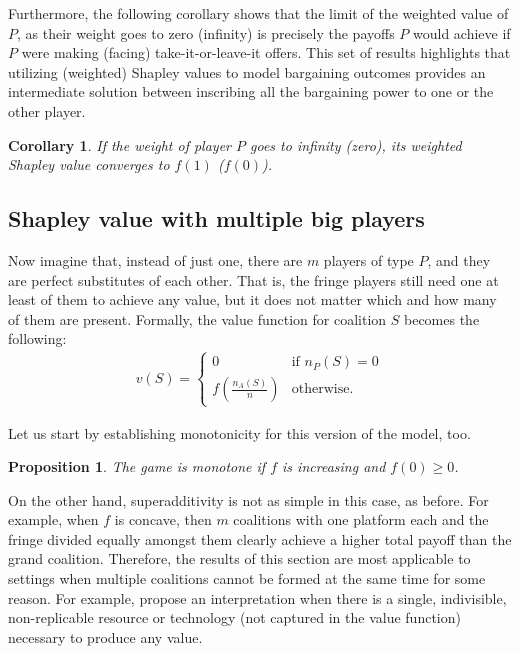 \documentclass[a4paper]{article}
\newtheorem{proposition}{Proposition}
\newtheorem{corollary}{Corollary}
\begin{document}
Furthermore, the following corollary shows that the limit of the weighted value of $P$, as their weight goes to zero (infinity) is precisely the payoffs $P$ would achieve if $P$ were making (facing) take-it-or-leave-it offers.
This set of results highlights that utilizing (weighted) Shapley values to model bargaining outcomes provides an intermediate solution between inscribing all the bargaining power to one or the other player.
\begin{corollary}
    \label{cor:paltform_value_weighted_2}
    If the weight of player $P$ goes to infinity (zero), its weighted Shapley value converges to $f(1)$ ($f(0)$).
\end{corollary}

\subsection{Shapley value with multiple big players}

Now imagine that, instead of just one, there are $m$ players of type $P$, and they are perfect substitutes of each other.
That is, the fringe players still need one at least of them to achieve any value, but it does not matter which and how many of them are present.
Formally, the value function for coalition $S$ becomes the following:
\begin{align*}
    v(S) = \begin{cases}
        0                              & \text{if } n_P(S) = 0 \\
        f\left(\frac{n_A(S)}{n}\right) & \text{otherwise}.
    \end{cases}
\end{align*}

Let us start by establishing monotonicity for this version of the model, too.
\begin{proposition}
    The game is monotone if $f$ is increasing and $f(0) \geq 0$.
\end{proposition}
On the other hand, superadditivity is not as simple in this case, as before.
For example, when $f$ is concave, then $m$ coalitions with one platform each and the fringe divided equally amongst them clearly achieve a higher total payoff than the grand coalition.
Therefore, the results of this section are most applicable to settings when multiple coalitions cannot be formed at the same time for some reason.
For example, \textcite{hart1996bargaining} propose an interpretation when there is a single, indivisible, non-replicable resource or technology (not captured in the value function) necessary to produce any value.
\end{document}
